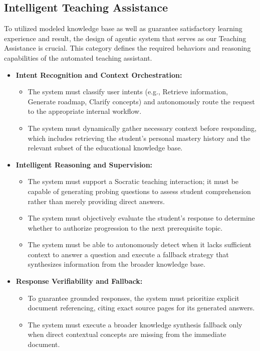\subsection{Intelligent Teaching Assistance}
To utilized modeled knowledge base as well as guarantee satisfactory learning experience and result, the design of agentic system that serves as our Teaching Assistance 
is crucial. This category defines the required behaviors and reasoning capabilities of the automated teaching assistant.

\begin{itemize}
    \item \textbf{Intent Recognition and Context Orchestration:}
    \begin{itemize}
        \item The system must classify user intents (e.g., Retrieve information, Generate roadmap, Clarify concepts) and autonomously route the request to the appropriate internal workflow.
        \item The system must dynamically gather necessary context before responding, which includes retrieving the student's personal mastery history and the relevant subset of the educational knowledge base.
    \end{itemize}
    
    \item \textbf{Intelligent Reasoning and Supervision:}
    \begin{itemize}
        \item The system must support a Socratic teaching interaction; it must be capable of generating probing questions to assess student comprehension 
        rather than merely providing direct answers.
        \item The system must objectively evaluate the student's response to determine whether to authorize progression to the next prerequisite topic.
        \item The system must be able to autonomously detect when it lacks sufficient context to answer a question and execute a fallback strategy that 
        synthesizes information from the broader knowledge base.
    \end{itemize}
    
    \item \textbf{Response Verifiability and Fallback:}
    \begin{itemize}
        \item To guarantee grounded responses, the system must prioritize explicit document referencing, citing exact source pages for its generated answers.
        \item The system must execute a broader knowledge synthesis fallback only when direct contextual concepts are missing from the immediate document.
    \end{itemize}
\end{itemize}


